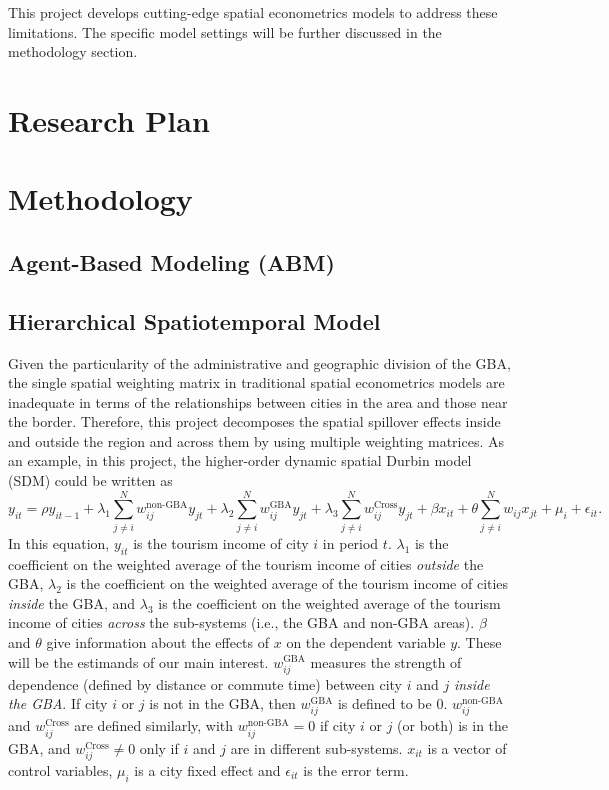 \documentclass[11pt,a4paper]{amsart}
\theoremstyle{plain}
\theoremstyle{definition}
\begin{document}
\noindent This project develops cutting-edge spatial econometrics models to address these limitations. The specific model settings will be further discussed in the methodology section. 

\section{Research Plan}
\section{Methodology}
\subsection{Agent-Based Modeling (ABM)}
\subsection{Hierarchical Spatiotemporal Model}\hfill\par 
\noindent Given the particularity of the administrative and geographic division of the GBA, the single spatial weighting matrix in traditional spatial econometrics models are inadequate in terms of the relationships between cities in the area and those near the border. Therefore, this project decomposes the spatial spillover effects inside and outside the region and across them by using multiple weighting matrices. As an example, in this project, the higher-order dynamic spatial Durbin model (SDM) could be written as 
\[	y_{it} = \rho y_{it-1} + \lambda_{1} \sum_{j \ne i}^{N}w_{ij}^{\text{non-GBA}}y_{jt} + \lambda_{2}\sum_{j \ne i}^{N}w_{ij}^{\text{GBA}} y_{jt} + \lambda_{3}\sum_{j \ne i}^{N}w_{ij}^{\text{Cross}} y_{jt}  + \beta x_{it} + \theta \sum_{j \ne i}^{N}w_{ij}x_{jt} + \mu_{i} + \epsilon_{it}.	\]
In this equation, $y_{it}$ is the tourism income of city $i$ in period $t$. $\lambda_{1}$ is the coefficient on the weighted average of the tourism income of cities \textit{outside} the GBA, $\lambda_{2}$ is the coefficient on the weighted average of the tourism income of cities \textit{inside} the GBA, and $\lambda_{3}$ is the coefficient on the weighted average of the tourism income of cities \textit{across} the sub-systems (i.e., the GBA and non-GBA areas). $\beta$ and $\theta$ give information about the effects of $x$ on the dependent variable $y$. These will be the estimands of our main interest. $w_{ij}^{\text{GBA}}$ measures the strength of dependence (defined by distance or commute time) between city $i$ and $j$ \textit{inside the GBA}. If city $i$ or $j$ is not in the GBA, then $w_{ij}^{\text{GBA}}$ is defined to be $0$. $w_{ij}^{\text{non-GBA}}$ and $w_{ij}^{\text{Cross}}$ are defined similarly, with $w_{ij}^{\text{non-GBA}} = 0$ if city $i$ or $j$ (or both) is in the GBA, and  $w_{ij}^{\text{Cross}} \ne 0$ only if $i$ and $j$ are in different sub-systems. $x_{it}$ is a vector of control variables, $\mu_{i}$ is a city fixed effect and $\epsilon_{it}$ is the error term. 
\end{document}
